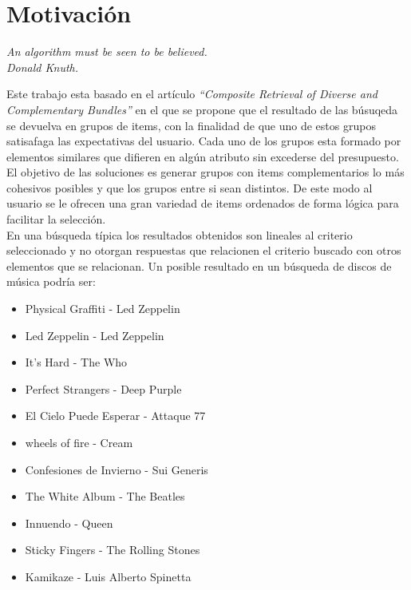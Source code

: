 \section{Motivación}
{\begin{small}%
\begin{flushright}%
\it An algorithm must be seen to be believed.\\Donald Knuth.
\end{flushright}%
\end{small}%
\vspace{.5cm}}
Este trabajo esta basado en el artículo \textit{\textquotedblleft Composite Retrieval of Diverse 
and Complementary Bundles\textquotedblright}\cite{compositeRetrival} en el que se propone 
que el resultado de las búsuqeda se devuelva en grupos de items, con la finalidad de que uno de estos grupos satisafaga
las expectativas del usuario. Cada uno de los grupos esta formado por elementos similares que difieren en algún atributo sin excederse del presupuesto.
El objetivo de las soluciones es generar grupos con items complementarios lo más cohesivos posibles y que los grupos entre si sean distintos.
De este modo al usuario se le ofrecen una gran variedad de items ordenados de forma lógica para facilitar la selección.\\

En una búsqueda típica los resultados obtenidos son lineales al criterio seleccionado y no otorgan respuestas que relacionen 
el criterio buscado con otros elementos que se relacionan. Un posible resultado en un búsqueda de discos de música podría ser:\\
\begin{itemize}
  \item Physical Graffiti - Led Zeppelin
  \item Led Zeppelin - Led Zeppelin
  \item It's Hard - The Who
  \item Perfect Strangers - Deep Purple
	\item El Cielo Puede Esperar - Attaque 77
  \item wheels of fire - Cream
	\item Confesiones de Invierno - Sui Generis
  \item The White Album - The Beatles
  \item Innuendo - Queen
  \item Sticky Fingers - The Rolling Stones
	\item Kamikaze - Luis Alberto Spinetta
\end{itemize}

